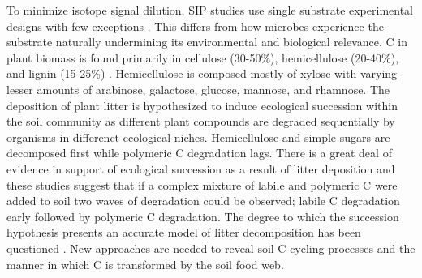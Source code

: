 To minimize isotope signal dilution, SIP studies use single substrate experimental designs with few exceptions \cite{Lueders_2003,Chauhan_2009}. This differs from how microbes experience the substrate naturally undermining its environmental and biological relevance. C in plant biomass is found primarily in cellulose (30-50\%), hemicellulose (20-40\%), and lignin (15-25\%) \cite{Lynd_2002}. Hemicellulose is composed mostly of xylose with varying lesser amounts of arabinose, galactose, glucose, mannose, and rhamnose. The deposition of plant litter is hypothesized to induce ecological succession within the soil community as different plant compounds are degraded sequentially by organisms in differenct ecological niches. Hemicellulose and simple sugars are decomposed first while polymeric C degradation lags. There is a great deal of evidence in support of ecological succession as a result of litter deposition \cite{GARRETT_1951, Alexander_1964, Engelking_2007, Hu_1997, Anderson_1973, Stotzky_1961, Alden_2001, Furukawa_1996, Fontaine_2003, Blagodatskaya_2007, Jenkins_2010, Rui_2009, Fierer_2010, Gessner_2010} and these studies suggest that if a complex mixture of labile and polymeric C were added to soil two waves of degradation could be observed; labile C degradation early followed by polymeric C degradation. The degree to which the succession hypothesis presents an accurate model of litter decomposition has been questioned \cite{Kj_ller_1982,Frankland_1998,Osono_2005}. New approaches are needed to reveal soil C cycling processes and the manner in which C is transformed by the soil food web.  


